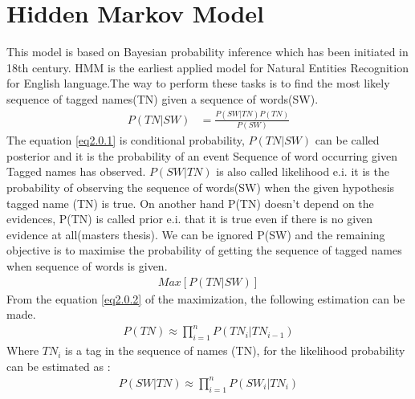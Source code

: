 \section{Hidden Markov Model}
This model is based on Bayesian probability inference which has been initiated in 18th century. HMM is the earliest applied model for Natural Entities Recognition for English language.The way to perform these tasks is to find the most likely sequence of tagged names(TN) given a sequence of words(SW).
\begin{align}
P(TN|SW) & = \frac{P(SW|TN)P(TN)}{P(SW)}\label{eq2.0.1}
\end{align}
The equation  \eqref{eq2.0.1} is conditional probability, $P(TN|SW)$ can be  called posterior and it is  the probability of an event Sequence of word occurring given Tagged names has observed.
$P(SW|TN)$ is also called likelihood e.i.  it is the probability of observing the sequence of words(SW) when the given hypothesis tagged name (TN) is true. On another hand
P(TN) doesn’t depend on the evidences, P(TN) is called prior e.i.  that it is true even if there is no given evidence at all(masters thesis).
We can be ignored P(SW)
and the remaining objective is to maximise the probability of getting the sequence of tagged names when sequence of words is given.
\begin{align}
Max\left[P(TN|SW)\right] \label{eq2.0.2}
\end{align}
From the equation \eqref{eq2.0.2} of the maximization, the following estimation can be made.
\begin{align}
P(TN){\approx} \prod_{i=1}^{n} P({TN}_{i}|{TN}_{i-1})\label{2.0.3}
\end{align}
Where ${TN}_{i}$ is a tag in the sequence of names (TN), for the likelihood probability can be estimated as :
\begin{align}
P(SW|TN){\approx}\prod_{i=1}^{n} P({SW}_{i}|{TN}_{i})\label{2.0.4}
\end{align}

